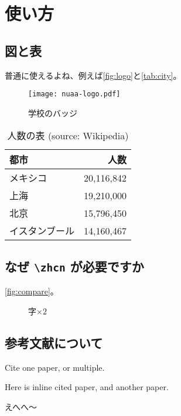 \chapter{使い方}

\section{図と表}

普通に使えるよね、例えば\autoref{fig:logo}と\autoref{tab:city}。

\begin{figure}[H]
  \texttt{[image: nuaa-logo.pdf]}
  \caption[バッジ]{学校のバッジ\label{fig:logo}}
\end{figure}

\begin{table}[htb]
  \caption[人数の表]{人数の表 (source: Wikipedia)\label{tab:city}}
  \begin{tabular}{lr}
    \toprule
    都市 & 人数 \\
    \midrule
    メキシコ & 20,116,842\\
    上海 & 19,210,000\\
    北京 & 15,796,450\\
    イスタンブール & 14,160,467\\
    \bottomrule
  \end{tabular}
\end{table}

\section{なぜ \texttt{\textbackslash zhcn} が必要ですか}

\autoref{fig:compare}。

\begin{figure}[H]
  \hfil
  \quad
  \caption{字$\times 2$\label{fig:compare}}
\end{figure}


\section{参考文献について}


Cite one paper\cite{r1}, or multiple\cite{r2,r3,r4}.

Here is inline cited paper, and another paper.

えへへ～
